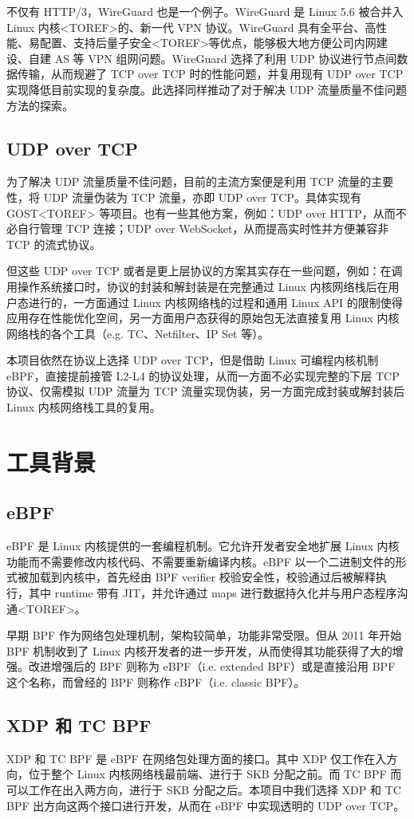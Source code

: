 不仅有 HTTP/3，WireGuard 也是一个例子。WireGuard 是 Linux 5.6 被合并入 Linux 内核<TOREF>的、新一代 VPN 协议。WireGuard 具有全平台、高性能、易配置、支持后量子安全<TOREF>等优点，能够极大地方便公司内网建设、自建 AS 等 VPN 组网问题。WireGuard 选择了利用 UDP 协议进行节点间数据传输，从而规避了 TCP over TCP 时的性能问题，并复用现有 UDP over TCP 实现降低目前实现的复杂度。此选择同样推动了对于解决 UDP 流量质量不佳问题方法的探索。

\subsection{UDP over TCP}

为了解决 UDP 流量质量不佳问题，目前的主流方案便是利用 TCP 流量的主要性，将 UDP 流量伪装为 TCP 流量，亦即 UDP over TCP。具体实现有 GOST<TOREF> 等项目。也有一些其他方案，例如：UDP over HTTP，从而不必自行管理 TCP 连接；UDP over WebSocket，从而提高实时性并方便兼容非 TCP 的流式协议。

但这些 UDP over TCP 或者是更上层协议的方案其实存在一些问题，例如：在调用操作系统接口时，协议的封装和解封装是在完整通过 Linux 内核网络栈后在用户态进行的，一方面通过 Linux 内核网络栈的过程和通用 Linux API 的限制使得应用存在性能优化空间，另一方面用户态获得的原始包无法直接复用 Linux 内核网络栈的各个工具（e.g. TC、Netfilter、IP Set 等）。

本项目依然在协议上选择 UDP over TCP，但是借助 Linux 可编程内核机制 eBPF，直接提前接管 L2-L4 的协议处理，从而一方面不必实现完整的下层 TCP 协议、仅需模拟 UDP 流量为 TCP 流量实现伪装，另一方面完成封装或解封装后 Linux 内核网络栈工具的复用。

\section{工具背景}

\subsection{eBPF}

eBPF 是 Linux 内核提供的一套编程机制。它允许开发者安全地扩展 Linux 内核功能而不需要修改内核代码、不需要重新编译内核。eBPF 以一个二进制文件的形式被加载到内核中，首先经由 BPF verifier 校验安全性，校验通过后被解释执行，其中 runtime 带有 JIT，并允许通过 maps 进行数据持久化并与用户态程序沟通<TOREF>。

早期 BPF 作为网络包处理机制，架构较简单，功能非常受限。但从 2011 年开始 BPF 机制收到了 Linux 内核开发者的进一步开发，从而使得其功能获得了大的增强。改进增强后的 BPF 则称为 eBPF（i.e. extended BPF）或是直接沿用 BPF 这个名称，而曾经的 BPF 则称作 cBPF（i.e. classic BPF）。\cite{10.1145/3371038}

\subsection{XDP 和 TC BPF}

XDP 和 TC BPF 是 eBPF 在网络包处理方面的接口。其中 XDP 仅工作在入方向，位于整个 Linux 内核网络栈最前端、进行于 SKB 分配之前。而 TC BPF 而可以工作在出入两方向，进行于 SKB 分配之后。本项目中我们选择 XDP 和 TC BPF 出方向这两个接口进行开发，从而在 eBPF 中实现透明的 UDP over TCP。
